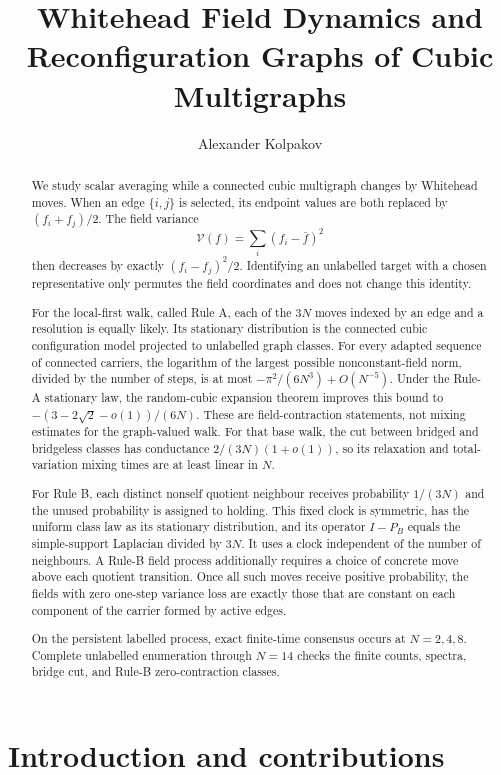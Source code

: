 \documentclass[11pt]{article}
\title{Whitehead Field Dynamics and Reconfiguration Graphs of Cubic Multigraphs}
\author{Alexander Kolpakov}
\date{}
\newcommand{\V}{\mathcal V}
\theoremstyle{definition}
\begin{document}
\maketitle

\begin{abstract}
We study scalar averaging while a connected cubic multigraph changes by
Whitehead moves.  When an edge $\{i,j\}$ is selected, its endpoint values are
both replaced by $(f_i+f_j)/2$.  The field variance
\[
  \V(f)=\sum_i(f_i-\bar f)^2
\]
then decreases by exactly $(f_i-f_j)^2/2$.  Identifying an unlabelled target
with a chosen representative only permutes the field coordinates and does not
change this identity.

For the local-first walk, called Rule A, each of the $3N$ moves indexed
by an edge and a resolution is equally likely. Its stationary distribution is the
connected cubic configuration model projected to unlabelled graph classes.
For every adapted sequence of connected carriers, the logarithm of the largest
possible nonconstant-field norm, divided by the number of steps, is at most
$-\pi^2/(6N^3)+O(N^{-5})$.  Under the Rule-A stationary law,
the random-cubic expansion theorem improves this bound to
$-(3-2\sqrt2-o(1))/(6N)$.  These are field-contraction statements, not mixing
estimates for the graph-valued walk.  For that base walk, the cut between
bridged and bridgeless classes has conductance $2/(3N)(1+o(1))$, so its
relaxation and total-variation mixing times are at least linear in $N$.

For Rule B, each distinct nonself quotient neighbour receives probability
$1/(3N)$ and the unused probability is assigned to holding.  This fixed clock
is symmetric, has the uniform class law as its stationary distribution, and
its operator $I-P_B$ equals the simple-support Laplacian divided by $3N$.  It
uses a clock independent of the number of neighbours. A Rule-B field
process additionally requires a choice of concrete move above each quotient
transition.  Once all
such moves receive positive probability, the fields with zero one-step
variance loss are exactly those that are constant on each component of the
carrier formed by active edges.

On the persistent labelled process, exact finite-time consensus occurs at
$N=2,4,8$.  Complete unlabelled enumeration through $N=14$ checks the finite
counts, spectra, bridge cut, and Rule-B zero-contraction classes.
\end{abstract}

\section{Introduction and contributions}
\end{document}
